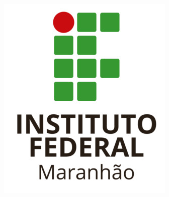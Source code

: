 \begin{capa}
    \setlength{\belowcaptionskip}{0pt}
    \setlength{\abovecaptionskip}{0pt}
    \setlength{\intextsep}{-18pt}
        \begin{figure}[h]
    		\begin{center}
    		    \includegraphics[scale=.5]{img/ifma_novo.jpg}
    		\end{center}
    	\end{figure}

        \center
    	{\ABNTEXchapterfont\large\imprimirinstituicao}

    	\vspace*{2cm}
    	    {\imprimirautor}
    	\vspace*{2cm}
        \begin{center}
    		\ABNTEXchapterfont\bfseries\large\imprimirtitulo
        \end{center}
    	\vfill

    	\ABNTEXchapterfont\bfseries\large\imprimirlocal\\
    	\the\year

    	\vspace*{1cm}
\end{capa}
